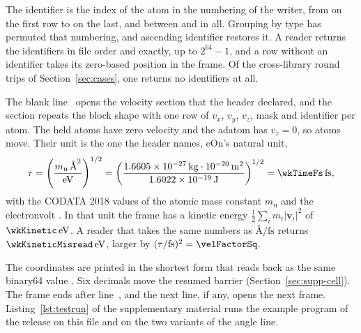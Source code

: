 The identifier is the index of the atom in the numbering of the writer,
from \wkIdFirst{} on the first row to \wkIdLast{} on the last, and
between \wkIdLow{} and \wkIdHigh{} in all.
Grouping by type has permuted that numbering, and ascending identifier
restores it.
A reader returns the identifiers in file order and exactly, up to
\(2^{64}-1\), and a row without an identifier takes its zero-based
position in the frame.
Of the cross-library round trips of Section~\ref{sec:cases}, one returns
no identifiers at all.

The blank line~\wkLineBlank{} opens the velocity section that the header
declared, and the section repeats the block shape with one row of
\(v_x\), \(v_y\), \(v_z\), mask and identifier per atom.
The held atoms have zero velocity and the adatom has \(v_z=0\), so
\wkMovingAtoms{} atoms move.
Their unit is the one the header names, eOn's natural unit,
\begin{equation}
\label{eq:tau}
\tau=\left(\frac{m_{\mathrm{u}}\,\text{\AA}^{2}}{\mathrm{eV}}\right)^{1/2}
=\left(\frac{1.6605\times10^{-27}\,\mathrm{kg}\cdot 10^{-20}\,\mathrm{m}^{2}}{1.6022\times10^{-19}\,\mathrm{J}}\right)^{1/2}
=\wkTimeFs\,\mathrm{fs},
\end{equation}
with the CODATA 2018 values of the atomic mass constant
\(m_{\mathrm{u}}\) and the electronvolt
\cite{tiesingaCodataRecommendedValues2021}.
In that unit the frame has a kinetic energy
\(\tfrac{1}{2}\sum_i m_i\lvert\mathbf{v}_i\rvert^2\) of
\(\wkKinetic\,\mathrm{eV}\).
A reader that takes the same numbers as \(\text{\AA}/\mathrm{fs}\)
returns \(\wkKineticMisread\,\mathrm{eV}\), larger by
\((\tau/\mathrm{fs})^2=\velFactorSq\).

The coordinates are printed in the shortest form that reads back as the
same binary64 value
\cite{steeleHowPrintFloatingpoint1990,adamsRyFastFloattostring2018,clingerHowReadFloating1990}.
Six decimals move the resumed barrier (Section~\ref{sec:supp-cell}).
The frame ends after line~\wkLineLastVelocity, and the next line, if
any, opens the next frame.
Listing~\ref*{lst:testrun} of the supplementary material runs the
example program of the release on this file and on the two variants of
the angle line.



